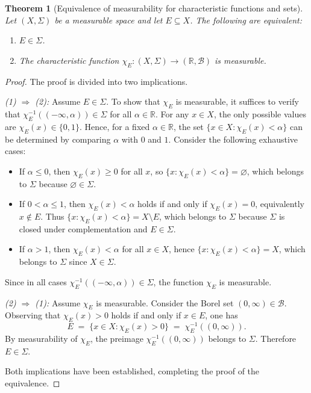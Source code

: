 \documentclass[12pt]{article}
\theoremstyle{plain}
\newtheorem{theorem}{Theorem}
\theoremstyle{definition}
\newcommand{\R}{\mathbb{R}}
\newcommand{\B}{\mathcal{B}}
\newcommand{\Sig}{\Sigma}
\begin{document}
\begin{theorem}[Equivalence of measurability for characteristic functions and sets]
Let \((X,\Sig)\) be a measurable space and let \(E \subseteq X\). The following are equivalent:
\begin{enumerate}
    \item \(E \in \Sig\).
    \item The characteristic function \(\chi_E: (X,\Sig) \to (\R,\B)\) is measurable.
\end{enumerate}
\end{theorem}

\begin{proof}
The proof is divided into two implications.

\medskip
\noindent
\emph{(1) \(\Rightarrow\) (2):} Assume \(E \in \Sig\). To show that \(\chi_E\) is measurable, it suffices to verify that \(\chi_E^{-1}((-\infty,\alpha)) \in \Sig\) for all \(\alpha \in \R\). For any \(x \in X\), the only possible values are \(\chi_E(x) \in \{0,1\}\). Hence, for a fixed \(\alpha \in \R\), the set \(\{x \in X : \chi_E(x) < \alpha\}\) can be determined by comparing \(\alpha\) with \(0\) and \(1\). Consider the following exhaustive cases:

\begin{itemize}
    \item If \(\alpha \le 0\), then \(\chi_E(x) \ge 0\) for all \(x\), so \(\{x : \chi_E(x) < \alpha\} = \varnothing\), which belongs to \(\Sig\) because \(\varnothing \in \Sig\).
    \item If \(0 < \alpha \le 1\), then \(\chi_E(x) < \alpha\) holds if and only if \(\chi_E(x)=0\), equivalently \(x \notin E\). Thus \(\{x : \chi_E(x) < \alpha\} = X \setminus E\), which belongs to \(\Sig\) because \(\Sig\) is closed under complementation and \(E \in \Sig\).
    \item If \(\alpha > 1\), then \(\chi_E(x) < \alpha\) for all \(x \in X\), hence \(\{x : \chi_E(x) < \alpha\} = X\), which belongs to \(\Sig\) since \(X \in \Sig\).
\end{itemize}

Since in all cases \(\chi_E^{-1}((-\infty,\alpha)) \in \Sig\), the function \(\chi_E\) is measurable.

\medskip
\noindent
\emph{(2) \(\Rightarrow\) (1):} Assume \(\chi_E\) is measurable. Consider the Borel set \((0,\infty) \in \B\). Observing that \(\chi_E(x) > 0\) holds if and only if \(x \in E\), one has
\[
E \;=\; \{x \in X : \chi_E(x) > 0\} \;=\; \chi_E^{-1}((0,\infty)).
\]
By measurability of \(\chi_E\), the preimage \(\chi_E^{-1}((0,\infty))\) belongs to \(\Sig\). Therefore \(E \in \Sig\).

\medskip
Both implications have been established, completing the proof of the equivalence.
\end{proof}
\end{document}

